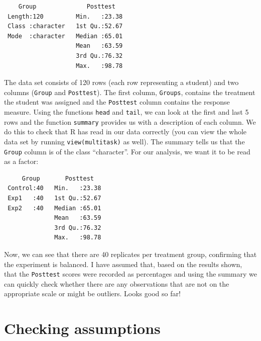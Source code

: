 \documentclass[
  letterpaper,
]{book}
\newenvironment{Shaded}{\begin{snugshade}}{\end{snugshade}}
\newcommand{\FunctionTok}[1]{\textcolor[rgb]{0.13,0.29,0.53}{\textbf{#1}}}
\newcommand{\NormalTok}[1]{#1}
\newcommand{\OtherTok}[1]{\textcolor[rgb]{0.56,0.35,0.01}{#1}}
\newcommand{\SpecialCharTok}[1]{\textcolor[rgb]{0.81,0.36,0.00}{\textbf{#1}}}
\begin{document}
\begin{verbatim}
    Group              Posttest    
 Length:120         Min.   :23.38  
 Class :character   1st Qu.:52.67  
 Mode  :character   Median :65.01  
                    Mean   :63.59  
                    3rd Qu.:76.32  
                    Max.   :98.78  
\end{verbatim}

The data set consists of 120 rows (each row representing a student) and
two columns (\texttt{Group} and \texttt{Posttest}). The first column,
\texttt{Groups}, contains the treatment the student was assigned and the
\texttt{Posttest} column contains the response measure. Using the
functions \texttt{head} and \texttt{tail}, we can look at the first and
last 5 rows and the function \texttt{summary} provides us with a
description of each column. We do this to check that R has read in our
data correctly (you can view the whole data set by running
\texttt{view(multitask)} as well). The summary tells us that the
\texttt{Group} column is of the class ``character''. For our analysis,
we want it to be read as a factor:

\begin{Shaded}
\end{Shaded}

\begin{verbatim}
     Group       Posttest    
 Control:40   Min.   :23.38  
 Exp1   :40   1st Qu.:52.67  
 Exp2   :40   Median :65.01  
              Mean   :63.59  
              3rd Qu.:76.32  
              Max.   :98.78  
\end{verbatim}

Now, we can see that there are 40 replicates per treatment group,
confirming that the experiment is balanced. I have assumed that, based
on the results shown, that the \texttt{Posttest} scores were recorded as
percentages and using the summary we can quickly check whether there are
any observations that are not on the appropriate scale or might be
outliers. Looks good so far!

\section{Checking assumptions}\label{checking-assumptions}
\end{document}
